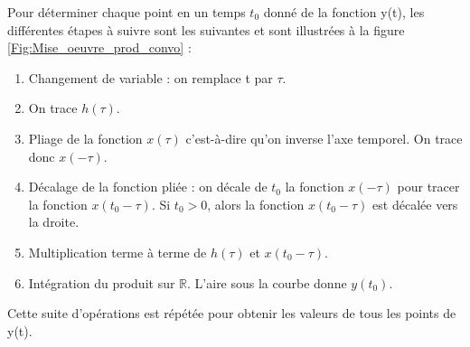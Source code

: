 	Pour déterminer chaque point en un temps $t_{0}$ donné de la fonction y(t), les différentes étapes à suivre sont les suivantes et sont illustrées à la figure \ref{Fig:Mise_oeuvre_prod_convo} :
	
	\begin{enumerate}
		\item Changement de variable : on remplace t par $\tau$.
		\item On trace $h(\tau)$.
		\item Pliage de la fonction $x(\tau)$ c'est-à-dire qu'on inverse l'axe temporel. On trace donc $x(-\tau)$.
		\item Décalage de la fonction pliée : on décale de $t_{0}$ la fonction $x(-\tau)$ pour tracer la fonction $x(t_{0}-\tau)$. Si $t_{0} > 0$, alors la fonction $x(t_{0}-\tau)$ est décalée vers la droite.
		\item Multiplication terme à terme de $h(\tau)$ et $x(t_{0}-\tau)$.
		\item Intégration du produit sur $\mathbb{R}$. L'aire sous la courbe donne $y(t_{0})$.
	\end{enumerate}

	Cette suite d'opérations est répétée pour obtenir les valeurs de tous les points de y(t).  
	
